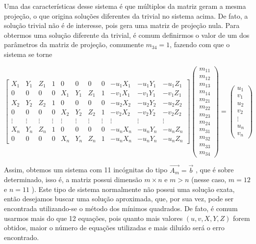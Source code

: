 \documentclass[ecp,tc]{iiufrgs}
\begin{document}
Uma das características desse sistema é que múltiplos da matriz geram a mesma projeção, o que origina soluções diferentes da trivial no sistema acima. De fato, a solução trivial não é de interesse, pois gera uma matriz de projeção nula. Para obtermos uma solução diferente da trivial, é comum definirmos o valor de um dos parâmetros da matriz de projeção, comumente $ m_{34} = 1 $, fazendo com que o sistema se torne

\[
\begin{bmatrix}
X_1 & Y_1 & Z_1 & 1 & 0 & 0 & 0 & 0 & -u_1X_1 & -u_1Y_1 & -u_1Z_1 \\
0 & 0 & 0 & 0 & X_1 & Y_1 & Z_1 & 1 & -v_1X_1 & -v_1Y_1 & -v_1Z_1 \\
X_2 & Y_2 & Z_2 & 1 & 0 & 0 & 0 & 0 & -u_2X_2 & -u_2Y_2 & -u_2Z_2 \\
0 & 0 & 0 & 0 & X_2 & Y_2 & Z_2 & 1 & -v_2X_2 & -v_2Y_2 & -v_2Z_2 \\
\vdots & \vdots & \vdots & \vdots & \vdots & \vdots & \vdots & \vdots & \vdots & \vdots & \vdots \\
X_n & Y_n & Z_n & 1 & 0 & 0 & 0 & 0 & -u_nX_n & -u_nY_n & -u_nZ_n \\
0 & 0 & 0 & 0 & X_n & Y_n & Z_n & 1 & -u_nX_n & -u_nY_n & -u_nZ_n 
\end{bmatrix}
\begin{pmatrix}m_{11} \\ m_{12} \\ m_{13} \\ m_{14} \\ m_{21} \\ m_{22} \\ m_{23} \\ m_{24} \\ m_{31} \\ m_{32} \\ m_{33} \\ m_{34} \end{pmatrix} = \begin{pmatrix} u_1 \\ v_1 \\ u_2 \\ v_2 \\ \vdots \\ u_n \\ v_n \end{pmatrix}
\]

Assim, obtemos um sistema com 11 incógnitas do tipo $ \vec{A_m} = \vec{b} $ , que é sobre determinado, isso é, a matriz possui dimensão $ m \times n $ e $ m > n $ (nesse caso, $ m = 12 $ e $ n = 11$ ). Este tipo de sistema normalmente não possui uma solução exata, então desejamos buscar uma solução aproximada, que, por sua vez, pode ser encontrada utilizando-se o método dos mínimos quadrados. De fato, é comum usarmos mais do que 12 equações, pois quanto mais valores $ (u, v, X, Y, Z) $ forem obtidos, maior o número de equações utilizadas e mais diluído será o erro encontrado.
\end{document}
